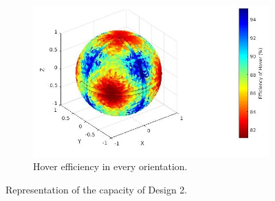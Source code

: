 \begin{figure}[!h]
{\begin{subfigure}[b]{0.5\textwidth}
  \end{subfigure}
  \begin{subfigure}[b]{0.45\textwidth}
    \includegraphics[width=\linewidth]{images/Quad_design_2_hspace.jpg}
    \caption{Hover efficiency in every orientation.} \label{fig:deisgn2_hspace}
  \end{subfigure}}
  \caption{Representation of the capacity of Design 2.}
  \label{fig:Quadcopter2_spaces}
\end{figure}

\begin{table}[!h]
\begin{center}
 \caption{Comparison between the two designs' force capabilities.}\vspace{1ex}
 \label{tab:tab_Quad_compare_force}
\end{center}
\end{table}

\begin{table}[!h]
\begin{center}
 \caption{Comparison between the two designs' torque capabilities.}\vspace{1ex}
 \label{tab:tab_Quad_compare_torque}
\end{center}
\end{table}

